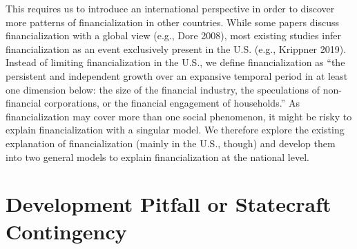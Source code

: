 \documentclass[
]{article}
\begin{document}
This requires us to introduce an international perspective in order to
discover more patterns of financialization in other countries. While
some papers discuss financialization with a global view (e.g., Dore
2008), most existing studies infer financialization as an event
exclusively present in the U.S. (e.g., Krippner 2019). Instead of
limiting financialization in the U.S., we define financialization as
``the persistent and independent growth over an expansive temporal
period in at least one dimension below: the size of the financial
industry, the speculations of non-financial corporations, or the
financial engagement of households.'' As financialization may cover more
than one social phenomenon, it might be risky to explain
financialization with a singular model. We therefore explore the
existing explanation of financialization (mainly in the U.S., though)
and develop them into two general models to explain financialization at
the national level.

\hypertarget{development-pitfall-or-statecraft-contingency}{%
\section{Development Pitfall or Statecraft
Contingency}\label{development-pitfall-or-statecraft-contingency}}
\end{document}

